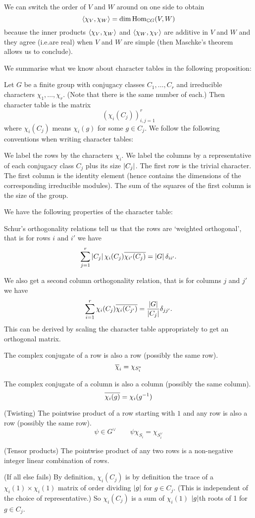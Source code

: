 \begin{rmk}
  We can switch the order of $V$ and $W$ around on one side to obtain
  \[{\left\langle \chi_V,\chi_W \right\rangle} = \dim \operatorname{Hom}_{\mathbb{C} G}(V,W)\]
  because the inner products ${\left\langle \chi_V,\chi_W \right\rangle}$ and ${\left\langle \chi_W,\chi_V \right\rangle}$ are additive in $V$ and $W$ and they agree (i.e.\@ are real) when $V$ and $W$ are simple (then Maschke's theorem allows us to conclude).
\end{rmk}

We summarise what we know about character tables in the following proposition:
\begin{prop}
  Let $G$ be a finite group with conjugacy classes $C_1,\ldots,C_r$ and irreducible characters $\chi_1,\ldots,\chi_r$.
  (Note that there is the same number of each.)
  Then character table is the matrix
  \[\left(\chi_i(C_j)\right)_{i,j=1}^r\]
  where $\chi_i(C_j)$ means $\chi_i(g)$ for some $g \in C_j$.
  We follow the following conventions when writing character tables:
  \begin{enum}
    \io We label the rows by the characters $\chi_i$.
    \io We label the columns by a representative of each conjugacy class $C_j$ plus its size $\left\lvert C_j \right\rvert$.
    \io The first row is the trivial character.
    \io The first column is the identity element (hence contains the dimensions of the corresponding irreducible modules).
    The sum of the squares of the first column is the size of the group.
  \end{enum}
  We have the following properties of the character table:
  \begin{enum}
    \io
    Schur's orthogonality relations tell us that the rows are `weighted orthogonal', that is for rows $i$ and $i'$ we have
    \[\sum_{j=1}^r \left\lvert C_j \right\rvert \chi_i(C_j) \overline{\chi_{i'}(C_j)} = \left\lvert G \right\rvert \delta_{ii'}.\]

    \io
    We also get a second column orthogonality relation, that is for columns $j$ and $j'$ we have
    \[\sum_{i=1}^r \chi_i(C_j) \overline{\chi_i(C_{j'})} = \frac{\left\lvert G \right\rvert}{\left\lvert C_j \right\rvert}\delta_{jj'}.\]
    This can be derived by scaling the character table appropriately to get an orthogonal matrix.

    \io
    The complex conjugate of a row is also a row (possibly the same row).
    \[\overline\chi_i = \chi_{S_i^*}\]

    \io
    The complex conjugate of a column is also a column (possibly the same column).
    \[\overline{\chi_i(g)} = \chi_i(g^{-1})\]

    \io
    (Twisting) The pointwise product of a row starting with $1$ and any row is also a row (possibly the same row).
    \[\psi \in G^\vee \qquad \psi\chi_{S_i}=\chi_{S_i^\vee}\]

    \io
    (Tensor products) The pointwise product of any two rows is a non-negative integer linear combination of rows.

    \io
    (If all else fails) By definition, $\chi_i(C_j)$ is by definition the trace of a $\chi_i(1) \times \chi_i(1)$ matrix of order dividing $\left\lvert g \right\rvert$ for $g \in C_j$.
    (This is independent of the choice of representative.)
    So $\chi_i(C_j)$ is a sum of $\chi_i(1)$ $\left\lvert g \right\rvert$th roots of 1 for $g \in C_j$.
  \end{enum}
\end{prop}

